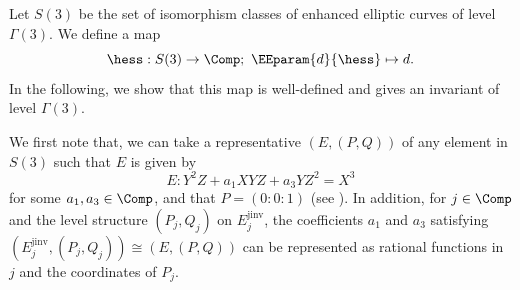 \documentclass{amsart}
\theoremstyle{definition}
\theoremstyle{remark}
\numberwithin{equation}{section}
\begin{document}
Let $S(3)$ be the set of isomorphism classes of
enhanced elliptic curves of level $\Gamma(3)$.
We define a map
\begin{equation*}
    \hess : S(3) \to \Comp;\
    \EEparam{d}{\hess} \mapsto d.
\end{equation*}
In the following,
we show that this map is well-defined
and gives an invariant of level $\Gamma(3)$.

We first note that,
we can take a representative $(E, (P, Q))$
of any element in $S(3)$
such that
$E$ is given by
\begin{equation}\label{eq:S3_weier}
    E : Y^2 Z + a_1 X Y Z + a_3 Y Z^2 = X^3
\end{equation}
for some $a_1, a_3 \in \Comp$,
and that $P = (0 : 0 : 1)$
(see \cite[Chap. 4 \S 2]{Husemoller2004elliptic}).
In addition,
for $j \in \Comp$ and the level structure $(P_j, Q_j)$ on $E_j^\mathrm{jinv}$,
the coefficients $a_1$ and $a_3$
satisfying $(E_j^\mathrm{jinv}, (P_j, Q_j)) \cong (E, (P, Q))$
can be represented as rational functions in $j$ and the coordinates of $P_j$.
\end{document}
